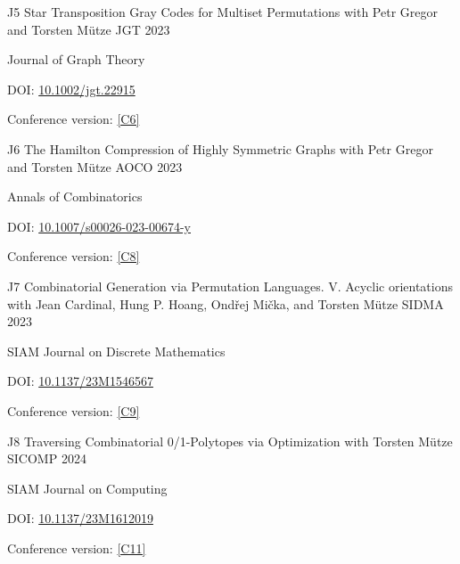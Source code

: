 \begin{cvpublication}
	{J5}
	{Star Transposition Gray Codes for Multiset Permutations}
	{with Petr Gregor and Torsten Mütze}
	{JGT}
	{2023}
    {
	\begin{cvitems}
	\item Journal of Graph Theory
	\item[] DOI: \href{https://doi.org/10.1002/jgt.22915}{10.1002/jgt.22915}
	\item Conference version: \hyperlink{paperC6}{[C6]}
	\end{cvitems}
	}
\end{cvpublication}
\begin{cvpublication}
	{J6}
	{The Hamilton Compression of Highly Symmetric Graphs}
	{with Petr Gregor and Torsten Mütze}
	{AOCO}
	{2023}
    {
	\begin{cvitems}
	\item Annals of Combinatorics
	\item[] DOI: \href{https://doi.org/10.1007/s00026-023-00674-y}{10.1007/s00026-023-00674-y}
	\item Conference version: \hyperlink{paperC8}{[C8]}
	\end{cvitems}
	}
\end{cvpublication}
\begin{cvpublication}
	{J7}
	{Combinatorial Generation via Permutation Languages. V. Acyclic orientations}
	{with Jean Cardinal, Hung P. Hoang, Ondřej Mička, and Torsten Mütze}
	{SIDMA}
	{2023}
    {
	\begin{cvitems}
	\item SIAM Journal on Discrete Mathematics
	\item[] DOI: \href{https://doi.org/10.1137/23M1546567}{10.1137/23M1546567}
	\item Conference version: \hyperlink{paperC9}{[C9]}
	\end{cvitems}
	}
\end{cvpublication}
\begin{cvpublication}
	{J8}
	{Traversing Combinatorial 0/1-Polytopes via Optimization}
	{with Torsten Mütze}
	{SICOMP}
	{2024}
    {
	\begin{cvitems}
	\item SIAM Journal on Computing
	\item[] DOI: \href{https://doi.org/10.1137/23M1612019}{10.1137/23M1612019}
	\item Conference version: \hyperlink{paperC11}{[C11]}
	\end{cvitems}
	}
\end{cvpublication}
